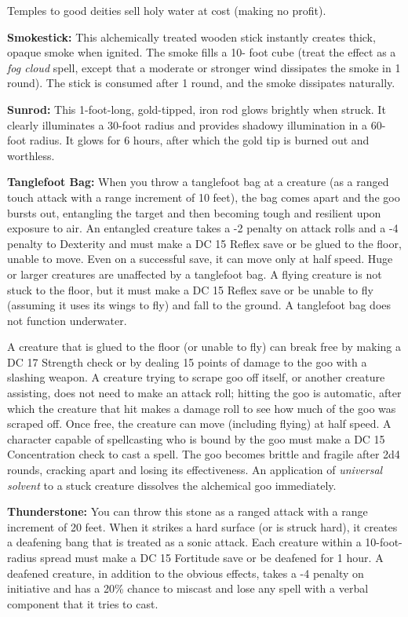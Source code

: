 \begin{multicols}{2}
Temples to good deities sell holy water at cost (making no profit).

\textbf{Smokestick:} This alchemically treated wooden stick instantly creates thick, 
opaque smoke when ignited. The smoke fills a 10- foot cube (treat the effect as 
a \textit{fog cloud }spell, except that a moderate or stronger wind dissipates 
the smoke in 1 round). The stick is consumed after 1 round, and the smoke dissipates 
naturally.

\textbf{Sunrod:} This 1-foot-long, gold-tipped, iron rod glows brightly when struck. 
It clearly illuminates a 30-foot radius and provides shadowy illumination in a 
60-foot radius. It glows for 6 hours, after which the gold tip is burned out and 
worthless.

\textbf{Tanglefoot Bag:} When you throw a tanglefoot bag at a creature (as a ranged 
touch attack with a range increment of 10 feet), the bag comes apart and the goo 
bursts out, entangling the target and then becoming tough and resilient upon exposure 
to air. An entangled creature takes a -2 penalty on attack rolls and a -4 penalty 
to Dexterity and must make a DC 15 Reflex save or be glued to the floor, unable 
to move. Even on a successful save, it can move only at half speed. Huge or larger 
creatures are unaffected by a tanglefoot bag. A flying creature is not stuck to 
the floor, but it must make a DC 15 Reflex save or be unable to fly (assuming it 
uses its wings to fly) and fall to the ground. A tanglefoot bag does not function 
underwater.

A creature that is glued to the floor (or unable to fly) can break free by making 
a DC 17 Strength check or by dealing 15 points of damage to the goo with a slashing 
weapon. A creature trying to scrape goo off itself, or another creature assisting, 
does not need to make an attack roll; hitting the goo is automatic, after which 
the creature that hit makes a damage roll to see how much of the goo was scraped 
off. Once free, the creature can move (including flying) at half speed. A character 
capable of spellcasting who is bound by the goo must make a DC 15 Concentration 
check to cast a spell. The goo becomes brittle and fragile after 2d4 rounds, cracking 
apart and losing its effectiveness. An application of \textit{universal solvent} 
to a stuck creature dissolves the alchemical goo immediately.

\textbf{Thunderstone:} You can throw this stone as a ranged attack with a range 
increment of 20 feet. When it strikes a hard surface (or is struck hard), it creates 
a deafening bang that is treated as a sonic attack. Each creature within a 10-foot-radius 
spread must make a DC 15 Fortitude save or be deafened for 1 hour. A deafened creature, 
in addition to the obvious effects, takes a -4 penalty on initiative and has a 
20\% chance to miscast and lose any spell with a verbal component that it tries 
to cast.


\end{multicols}
